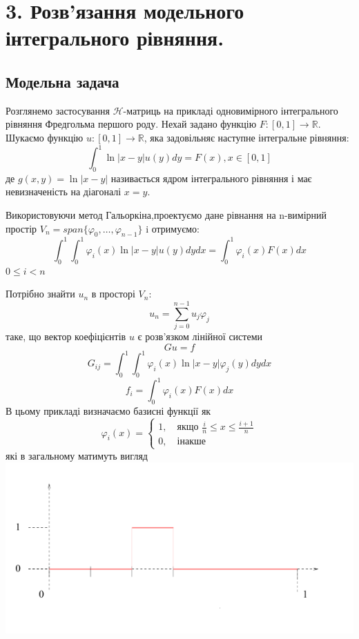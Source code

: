 \documentclass[12pt]{report}
\begin{document}
	\chapter{3. Розв'язання модельного інтегрального рівняння.}
	\section{Модельна задача}
	\hspace{0.8cm}Розглянемо застосування {$\mathcal{H}$}-матриць на прикладі одновимірного інтегрального рівняння Фредгольма першого роду. Нехай задано функцію $F:[0,1]\rightarrow \mathbb{R}$. Шукаємо функцію $u:[0,1]\rightarrow \mathbb{R}$, яка задовільняє наступне інтегральне рівняння: $$\int_{0}^{1}\ln|x-y|u(y)dy=F(x), x\in[0,1]$$
	де $g(x,y)=\ln|x-y|$ називається ядром інтегрального рівняння і має невизначеність на діагоналі $x=y$.
	\par Використовуючи метод Гальоркіна,проектуємо дане рівнання на n-вимірний простір $V_n=span\{\varphi_0,\dots,\varphi_{n-1}\}$
	i отримуємо:
	$$\int_{0}^{1}\int_{0}^{1}\varphi_i(x)\ln|x-y|u(y)dydx=\int_{0}^{1}\varphi_i(x)F(x)dx$$
	$0\le i<n$
	\par Потрібно знайти $u_n$ в просторі $V_n$:
	$$u_n=\sum_{j=0}^{n-1}u_j\varphi_j$$
	таке, що вектор коефіцієнтів $u$ є розв'язком лінійної системи $$Gu=f$$
	$$G_{ij}=\int_{0}^{1}\int_{0}^{1}\varphi_i(x)\ln|x-y|\varphi_j(y)dydx$$
	$$f_i=\int_{0}^{1}\varphi_i(x)F(x)dx$$
	 В цьому прикладі визначаємо базисні функції як
	\newline 
	\begin{equation*}
	\varphi_i(x)=\begin{cases}
			1,\quad\text{якщо $\frac{i}{n}\le x\le \frac{i+1}{n}$}\\
			0,\quad\text{інакше}
				\end{cases}
	\end{equation*}
	\newline
	які в загальному матимуть вигляд 
	\newline
		\includegraphics{1_1}
\end{document}
